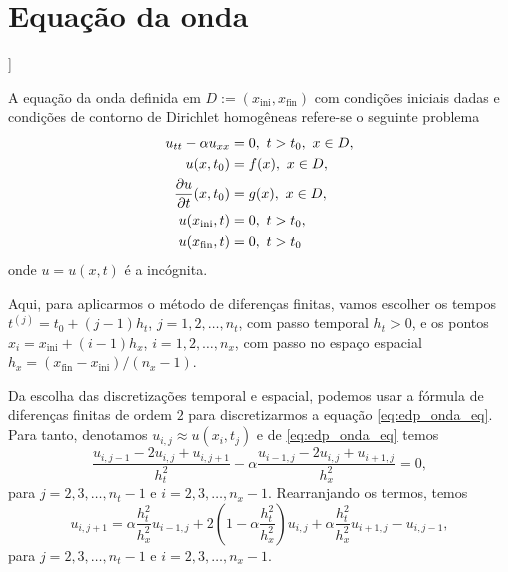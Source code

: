 \section{Equação da onda}\label{cap_edp_sec_onda}

\begin{flushleft}
  [[tag:revisar]]
\end{flushleft}

A equação da onda definida em  $D := (x_{\text{ini}}, x_{\text{fin}})$ com condições iniciais dadas e condições de contorno de Dirichlet homogêneas refere-se o seguinte problema
\begin{align}
  u_{tt} - \alpha u_{xx} &= 0,~t>t_0,~x\in D, \label{eq:edp_onda_eq}\\
  u(x,t_0) &= f(x),~x\in D,\label{eq:edp_onda_ci1}\\
  \frac{\partial u}{\partial t}(x,t_0) &= g(x),~x\in D,\label{eq:edp_onda_ci2}\\
  u(x_{\text{ini}},t) &= 0,~t>t_0,\label{eq:edp_onda_bcxini}\\
  u(x_{\text{fin}},t) &= 0,~t>t_0\label{eq:edp_onda_bcxfin}
\end{align}
onde $u = u(x,t)$ é a incógnita.

Aqui, para aplicarmos o método de diferenças finitas, vamos escolher os tempos $t^{(j)} = t_0 + (j-1)h_t$, $j=1, 2, \dotsc, n_t$, com passo temporal $h_t>0$, e os pontos $x_i=x_{\text{ini}}+(i-1)h_x$, $i=1, 2, \dotsc, n_x$, com passo no espaço espacial $h_x = (x_{\text{fin}}-x_{\text{ini}})/(n_x-1)$.

Da escolha das discretizações temporal e espacial, podemos usar a fórmula de diferenças finitas de ordem $2$ para discretizarmos a equação \eqref{eq:edp_onda_eq}. Para tanto, denotamos $u_{i,j} \approx u(x_i,t_j)$ e de \eqref{eq:edp_onda_eq} temos
\begin{equation}
  \frac{u_{i,j-1}-2u_{i,j}+u_{i,j+1}}{h_t^2} - \alpha\frac{u_{i-1,j}-2u_{i,j}+u_{i+1,j}}{h_x^2} = 0,
\end{equation}
para $j=2, 3, \dotsc, n_t-1$ e $i=2, 3, \dotsc, n_x-1$. Rearranjando os termos, temos
\begin{equation}\label{eq:edp_onda_aux1}
  u_{i,j+1} = \alpha\frac{h_t^2}{h_x^2}u_{i-1,j} + 2\left(1-\alpha\frac{h_t^2}{h_x^2}\right)u_{i,j} + \alpha\frac{h_t^2}{h_x^2}u_{i+1,j} - u_{i,j-1},
\end{equation}
para $j=2, 3, \dotsc, n_t-1$ e $i=2, 3, \dotsc, n_x-1$.

